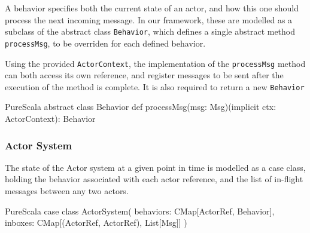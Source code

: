 \documentclass[a4paper,twoside]{article}
\newcommand{\InlineS}[1]{\lstinline[language=PureScala,basicstyle=\small\ttfamily,columns=fixed]|#1|}
\begin{document}
A behavior specifies both the current state of an actor, and how this one should 
process the next incoming message. In our framework, these are modelled as a subclass 
of the abstract class \InlineS{Behavior}, which defines a single abstract method 
\InlineS{processMsg}, to be overriden for each defined behavior.

Using the provided \InlineS{ActorContext}, the implementation of the \InlineS{processMsg}
method can both access its own reference, and register messages to be sent after the
execution of the method is complete. It is also required to return a new \InlineS{Behavior}

\begin{ShortCode}{PureScala}
abstract class Behavior {
  def processMsg(msg: Msg)(implicit ctx: ActorContext): Behavior
}
\end{ShortCode}

%
%

\vspace{-15pt}
\subsubsection*{Actor System}

The state of the Actor system at a given point in time is modelled as a case class, 
holding the behavior associated with each actor reference, and the list of in-flight messages between any two actors.


\begin{ShortCode}{PureScala}
case class ActorSystem(
  behaviors: CMap[ActorRef, Behavior],
  inboxes: CMap[(ActorRef, ActorRef), List[Msg]]
)
\end{ShortCode}
\end{document}
